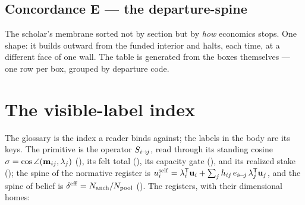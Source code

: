 \documentclass[../main]{subfiles}
\begin{document}
\subsection{Concordance E --- the departure-spine}
\label{subsec:log:concordance}
The scholar's membrane sorted not by section but by \emph{how} economics stops. One shape: it
builds outward from the funded interior and halts, each time, at a different face of one wall.
The table is generated from the boxes themselves --- one row per \registername{[econ]} box, grouped
by departure code.

\GenerateConcordanceE

\noindent

\clearpage
\section{The visible-label index}
\label{app:index}

The glossary is the index a reader binds against; the labels in the body are its keys. The
primitive is the operator $S\sb{ i\!\to\!j }$, read through its standing cosine
$\sigma=\cos\angle(\mathbf{m}\sb{ ij },\lambda\sb{j})$ (), its
felt total  (), its capacity gate
 (), and its realized stake
 (); the
spine of the normative register is
$u\sb{i}\sp{\mathrm{self}}=\lambda\sb{i}\sp{\mathsf{T}}\mathbf{u}\sb{i}+\sum_jh\sb{ ij }\,e\sb{ \ensuremath{i\!\leftarrow\!j} }\,\lambda\sb{j}\sp{\mathsf{T}}\mathbf{u}\sb{j}$, and the spine of belief is
$\effdensity=\countanch/\countpool$ (). The registers, with
their dimensional homes:
\end{document}
